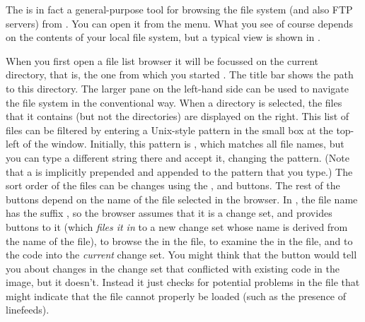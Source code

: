 \documentclass[a4paper,10pt,twoside]{book}
\begin{document}
The  is in fact a general-purpose tool for browsing the file system (and also FTP servers) from \pharo. 
You can open it from the  menu.
What you see of course depends on the contents of your local file system, but a typical view is shown in .

When you first open a file list browser it will be focussed on the current directory, that is, the one from which you started \pharo. The title bar shows the path to this directory.
The larger pane on the left-hand side can be used to navigate the file system in the conventional way.
When a directory is selected, the files that it contains (but not the directories) are displayed on the right.
This list of files can be filtered by entering a Unix-style pattern in the small box at the top-left of the window.  
Initially, this pattern is \ct{*}, which matches all file names, but you can type a different string there and accept it, changing the pattern.  (Note that a \ct{*} is implicitly prepended and appended to the pattern that you type.)
The sort order of the files can be changes using the ,  and  buttons.
The rest of the buttons depend on the name of the file selected in the browser.
In , the file name has the suffix , so the browser assumes that it is a change set, and provides buttons to  it (which \textit{files it in} to a new change set whose name is derived from the name of the file),  to browse the  in the file, to examine the  in the file, 
and to  the code into the \emph{current} change set.
You might think that the  button would tell you about changes in the change set that conflicted with existing code in the image, but it doesn't.
Instead it just checks for potential problems in the file that might indicate that the file cannot properly be loaded (such as the presence of linefeeds).
\end{document}
